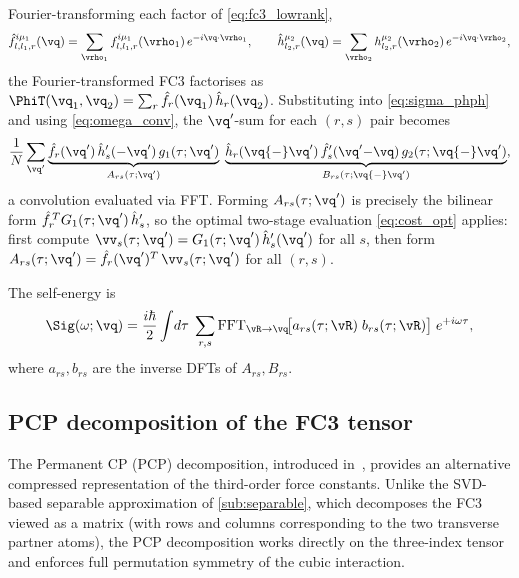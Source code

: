 Fourier-transforming each factor of \cref{eq:fc3_lowrank},
\begin{equation}
  \hat{f}^{i\mu_1}_{l,l_1,r}(\vq)
  = \sum_{\vrho_1} f^{i\mu_1}_{l,l_1,r}(\vrho_1)\,
    e^{-i\vq\cdot\vrho_1},
  \qquad
  \hat{h}^{\mu_2}_{l_2,r}(\vq)
  = \sum_{\vrho_2} h^{\mu_2}_{l_2,r}(\vrho_2)\,
    e^{-i\vq\cdot\vrho_2},
  \label{eq:fh_fourier}
\end{equation}
the Fourier-transformed FC3 factorises as
$\PhiT(\vq_1,\vq_2) = \sum_r \hat{f}_r(\vq_1)\,\hat{h}_r(\vq_2)$.
Substituting into \cref{eq:sigma_phph} and using
\cref{eq:omega_conv}, the $\vq'$-sum for each $(r,s)$ pair
becomes
\begin{equation}
  \frac{1}{N}\sum_{\vq'}
  \underbrace{
    \hat{f}_r(\vq')\,\hat{h}'_s({-}\vq')\,g_1(\tau;\vq')
  }_{A_{rs}(\tau;\vq')}
  \;\underbrace{
    \hat{h}_r(\vq{-}\vq')\,\hat{f}'_s(\vq'{-}\vq)\,
    g_2(\tau;\vq{-}\vq')
  }_{B_{rs}(\tau;\vq{-}\vq')},
  \label{eq:lr_AB}
\end{equation}
a convolution evaluated via FFT.  Forming
$A_{rs}(\tau;\vq')$ is precisely the bilinear form
$\hat{f}_r^{\,T} G_1(\tau;\vq')\,\hat{h}'_s$, so the
optimal two-stage evaluation \cref{eq:cost_opt} applies:
first compute
$\vv_s(\tau;\vq') = G_1(\tau;\vq')\,\hat{h}'_s(\vq')$
for all $s$, then form
$A_{rs}(\tau;\vq') = \hat{f}_r(\vq')^T\,\vv_s(\tau;\vq')$
for all $(r,s)$.

The self-energy is
\begin{equation}
  \Sig(\omega;\vq)
  = \frac{i\hbar}{2}
    \int\!d\tau\;
    \sum_{r,s}
    \mathrm{FFT}_{\vR\to\vq}\!\bigl[
      a_{rs}(\tau;\vR)\;b_{rs}(\tau;\vR)
    \bigr]\;e^{+i\omega\tau},
  \label{eq:sigma_sep}
\end{equation}
where $a_{rs}, b_{rs}$ are the inverse DFTs of $A_{rs}, B_{rs}$.



\subsection{PCP decomposition of the FC3 tensor}
\label{sub:pcp}

The Permanent CP (PCP) decomposition, introduced in~\cite{luo_tensor_2025},
provides an alternative compressed
representation of the third-order force constants.  Unlike the SVD-based
separable approximation of \cref{sub:separable}, which decomposes the
FC3 viewed as a matrix (with rows and columns corresponding to the two
transverse partner atoms), the PCP decomposition works directly on the
three-index tensor and enforces full permutation symmetry of
the cubic interaction.

